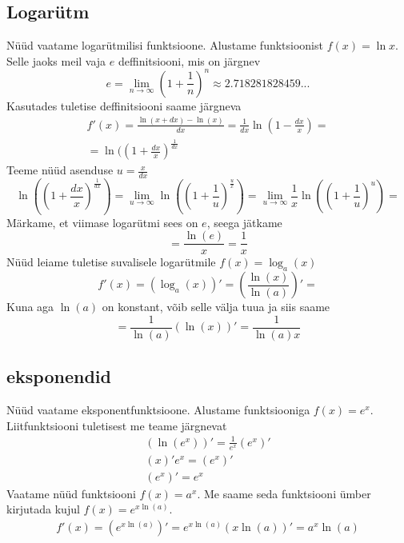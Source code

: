 \documentclass[a4paper,11pt,twocolumn]{article}
\begin{document}
\subsection{Logarütm}
Nüüd vaatame logarütmilisi funktsioone. Alustame funktsioonist $f(x) = \ln x$. Selle jaoks meil vaja $e$ deffinitsiooni, mis on järgnev
\begin{equation*}
e=\lim_{n \to \infty}(1+\frac{1}{n})^n \approx 2.718281828459...
\end{equation*}
Kasutades tuletise deffinitsiooni saame järgneva
\begin{multline*}
  f'(x)=\frac{\ln(x+dx) - \ln(x)}{dx}=\frac{1}{dx}\ln(1-\frac{dx}{x})=\\
  =\ln((1+\frac{dx}{x})^{\frac{1}{dx}}
\end{multline*}
Teeme nüüd asenduse $u=\frac{x}{dx}$
\begin{equation*}
\ln((1+\frac{dx}{x})^{\frac{1}{dx}})=\lim_{u \to \infty}\ln((1+\frac{1}{u})^{\frac{u}{x}}) = \lim_{u \to \infty}\frac{1}{x}\ln((1+\frac{1}{u})^{u})=
\end{equation*}
Märkame, et viimase logarütmi sees on $e$, seega jätkame
\begin{equation*}
=\frac{\ln(e)}{x}=\frac{1}{x}
\end{equation*}
Nüüd leiame tuletise suvalisele logarütmile $f(x)=\log_{a}(x)$
\begin{equation*}
f'(x)=(\log_{a}(x))'=(\frac{\ln(x)}{\ln(a)})'=
\end{equation*}
Kuna aga $\ln(a)$ on konstant, võib selle välja tuua ja siis saame
\begin{equation*}
=\frac{1}{\ln(a)}(\ln(x))'=\frac{1}{\ln(a)x}
\end{equation*}

\subsection{eksponendid}
Nüüd vaatame eksponentfunktsioone. Alustame funktsiooniga $f(x)=e^x$. Liitfunktsiooni tuletisest me teame järgnevat
\begin{multline*}
  (\ln(e^x))'=\frac{1}{e^x}(e^x)'\\
  (x)'e^x=(e^x)'\\
  (e^x)'=e^x
\end{multline*}
Vaatame nüüd funktsiooni $f(x)=a^x$. Me saame seda funktsiooni ümber kirjutada kujul $f(x)=e^{x\ln(a)}$.
\begin{multline*}
f'(x)=(e^{x\ln(a)} )'=e^{x\ln(a)}(x\ln(a))'=a^x\ln(a)
\end{multline*}
\end{document}
